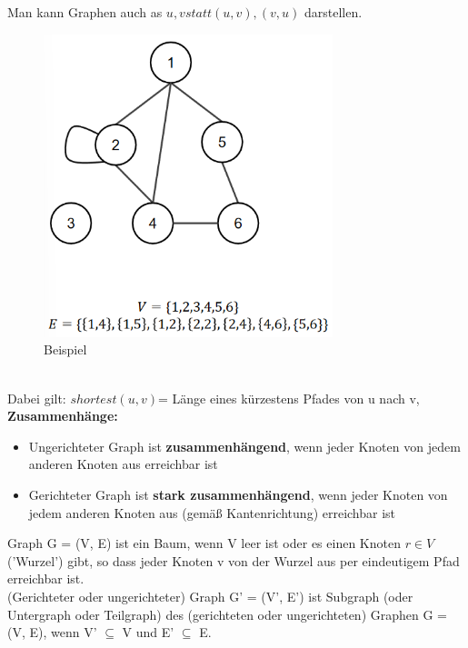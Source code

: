\documentclass{article}
\begin{document}
            Man kann Graphen auch as ${u,v} statt (u,v),(v,u)$ darstellen.\\
            \begin{figure}[ht]
                \centering
                \includegraphics[width=0.75\textwidth]{Bilder/UgGraphBSP.png}
                \caption{Beispiel}
                \label{fig:UgGraphBSP}
            \end{figure}\\
            Dabei gilt: $shortest(u,v)$= Länge eines kürzestens Pfades von u nach v,\\
            \textbf{Zusammenhänge:}
            \begin{itemize}
                \item Ungerichteter Graph ist \textbf{zusammenhängend}, wenn jeder Knoten von jedem anderen Knoten aus erreichbar ist
                \item Gerichteter Graph ist \textbf{stark zusammenhängend}, wenn jeder Knoten von jedem anderen Knoten aus (gemäß Kantenrichtung) erreichbar ist
            \end{itemize}
            Graph G = (V, E) ist ein Baum, wenn V leer ist oder es einen Knoten $r\in V$ ('Wurzel') gibt, so dass jeder Knoten v von der Wurzel aus per eindeutigem Pfad erreichbar ist.\\
            (Gerichteter oder ungerichteter) Graph G' = (V', E') ist Subgraph (oder Untergraph oder Teilgraph) des (gerichteten oder ungerichteten) Graphen G = (V, E), wenn V' $\subseteq$ V und E' $\subseteq$ E.\\
\end{document}
